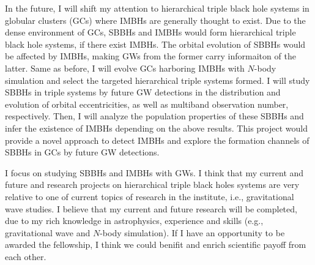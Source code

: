 \documentclass[12pt,a4paper,sans]{article}%
\begin{document}
In the future, I will shift my attention to hierarchical triple black hole systems in globular clusters (GCs) where
IMBHs are generally thought to exist. Due to the dense environment of GCs, SBBHs and IMBHs would form hierarchical
triple black hole systems, if there exist IMBHs. The orbital evolution of SBBHs would be affected by IMBHs, making GWs
from the former carry informaiton of the latter. Same as before, I will evolve GCs harboring IMBHs with $N$-body simulation and
select the targeted hierarchical triple systems formed. I will study SBBHs in triple systems by future GW detections in the distribution and evolution of orbital
eccentricities, as well as multiband observation number, respectively. Then, I will analyze the population properties of these SBBHs and infer the existence of IMBHs depending on the above results. This project would provide a novel approach to detect IMBHs and explore the formation channels of SBBHs in GCs by future GW detections.  

I focus on studying SBBHs and IMBHs with GWs. I think that my current and future and research projects on
hierarchical triple
black holes systems are very relative to one of current topics of research in the institute, i.e., gravitational wave studies. I believe that my current and future research will be completed, due to my rich knowledge in astrophysics, experience and skills (e.g., gravitational wave and $N$-body
simulation). If I have an opportunity to be awarded the fellowship, I think we could benifit and enrich scientific payoff from each other. 




%
\end{document}
